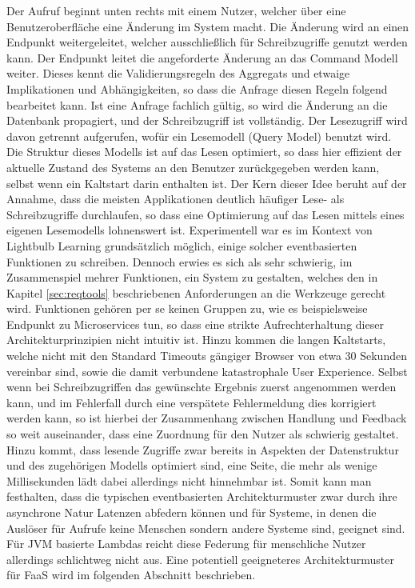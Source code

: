 \noindent Der Aufruf beginnt unten rechts mit einem Nutzer, welcher über eine Benutzeroberfläche eine Änderung im System macht. Die Änderung wird an einen Endpunkt weitergeleitet, welcher ausschließlich für Schreibzugriffe genutzt werden kann. Der Endpunkt leitet die angeforderte Änderung an das Command Modell weiter. Dieses kennt die Validierungsregeln des Aggregats und etwaige Implikationen und Abhängigkeiten, so dass die Anfrage diesen Regeln folgend bearbeitet kann. Ist eine Anfrage fachlich gültig, so wird die Änderung an die Datenbank propagiert, und der Schreibzugriff ist vollständig. Der Lesezugriff wird davon getrennt aufgerufen, wofür ein Lesemodell (Query Model) benutzt wird. Die Struktur dieses Modells ist auf das Lesen optimiert, so dass hier effizient der aktuelle Zustand des Systems an den Benutzer zurückgegeben werden kann, selbst wenn ein Kaltstart darin enthalten ist. Der Kern dieser Idee beruht auf der Annahme, dass die meisten Applikationen deutlich häufiger Lese- als Schreibzugriffe durchlaufen, so dass eine Optimierung auf das Lesen mittels eines eigenen Lesemodells lohnenswert ist. Experimentell war es im Kontext von Lightbulb Learning grundsätzlich möglich, einige solcher eventbasierten Funktionen zu schreiben. Dennoch erwies es sich als sehr schwierig, im Zusammenspiel mehrer Funktionen, ein System zu gestalten, welches den in Kapitel \ref{sec:reqtools} beschriebenen Anforderungen an die Werkzeuge gerecht wird. Funktionen gehören per se keinen Gruppen zu, wie es beispielsweise Endpunkt zu Microservices tun, so dass eine strikte Aufrechterhaltung dieser Architekturprinzipien nicht intuitiv ist. Hinzu kommen die langen Kaltstarts, welche nicht mit den Standard Timeouts gängiger Browser von etwa 30 Sekunden vereinbar sind, sowie die damit verbundene katastrophale User Experience. Selbst wenn bei Schreibzugriffen das gewünschte Ergebnis zuerst angenommen werden kann, und im Fehlerfall durch eine verspätete Fehlermeldung dies korrigiert werden kann, so ist hierbei der Zusammenhang zwischen Handlung und Feedback so weit auseinander, dass eine Zuordnung für den Nutzer als schwierig gestaltet. Hinzu kommt, dass lesende Zugriffe zwar bereits in Aspekten der Datenstruktur und des zugehörigen Modells optimiert sind, eine Seite, die mehr als wenige Millisekunden lädt dabei allerdings nicht hinnehmbar ist. Somit kann man festhalten, dass die typischen eventbasierten Architekturmuster zwar durch ihre asynchrone Natur Latenzen abfedern können und für Systeme, in denen die Auslöser für Aufrufe keine Menschen sondern andere Systeme sind, geeignet sind. Für JVM basierte Lambdas reicht diese Federung für menschliche Nutzer allerdings schlichtweg nicht aus. Eine potentiell geeigneteres Architekturmuster für FaaS wird im folgenden Abschnitt beschrieben.
